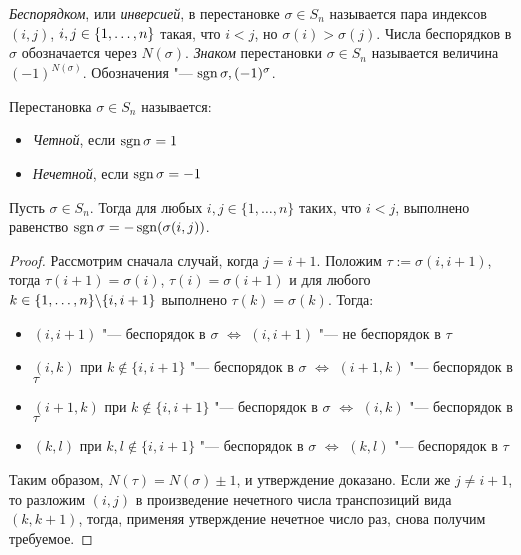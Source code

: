 \begin{definition}
	\textit{Беспорядком}, или \textit{инверсией}, в перестановке $\sigma \in S_n$ называется пара индексов $(i, j)$, $i, j \in \{1, \dotsc, n\}$ такая, что $i < j$, но $\sigma(i) > \sigma(j)$. Числа беспорядков в $\sigma$ обозначается через $N(\sigma)$. \textit{Знаком} перестановки $\sigma \in S_n$ называется величина $(-1)^{N(\sigma)}$. Обозначения "--- $\operatorname{sgn}{\sigma}, (-1)^{\sigma}$.
\end{definition}

\begin{definition}
	Перестановка $\sigma \in S_n$ называется:
	\begin{itemize}
		\item \textit{Четной}, если $\operatorname{sgn}{\sigma} = 1$
		\item \textit{Нечетной}, если $\operatorname{sgn}{\sigma} = -1$
	\end{itemize}
\end{definition}

\begin{proposition}
	Пусть $\sigma \in S_n$. Тогда для любых $i, j \in \{1, \dots, n\}$ таких, что $i < j$, выполнено равенство $\operatorname{sgn}{\sigma} = -\operatorname{sgn}(\sigma(i, j))$.
\end{proposition}

\begin{proof}
	Рассмотрим сначала случай, когда $j = i + 1$. Положим $\tau := \sigma(i, i + 1)$, тогда $\tau(i + 1) = \sigma(i)$, $\tau(i) = \sigma(i + 1)$ и для любого $k \in \{1, \dotsc, n\} \backslash \{i, i+1\}$ выполнено $\tau(k) = \sigma(k)$. Тогда:
	\begin{itemize}
		\item $(i, i+1)$ "--- беспорядок в $\sigma$ $\Leftrightarrow$ $(i, i+1)$ "--- не беспорядок в $\tau$
		\item $(i, k)$ при $k \not\in \{i, i+1\}$ "--- беспорядок в $\sigma$ $\Leftrightarrow$ $(i + 1, k)$ "--- беспорядок в $\tau$
		\item $(i+1, k)$ при $k \not\in \{i, i+1\}$ "--- беспорядок в $\sigma$ $\Leftrightarrow$ $(i, k)$ "--- беспорядок в $\tau$
		\item $(k, l)$ при $k, l \not\in \{i, i+1\}$ "--- беспорядок в $\sigma$ $\Leftrightarrow$ $(k, l)$ "--- беспорядок в $\tau$
	\end{itemize}

	Таким образом, $N(\tau) = N(\sigma) \pm 1$, и утверждение доказано. Если же $j \ne i + 1$, то разложим $(i, j)$ в произведение нечетного числа транспозиций вида $(k, k + 1)$, тогда, применяя утверждение нечетное число раз, снова получим требуемое.
\end{proof}

